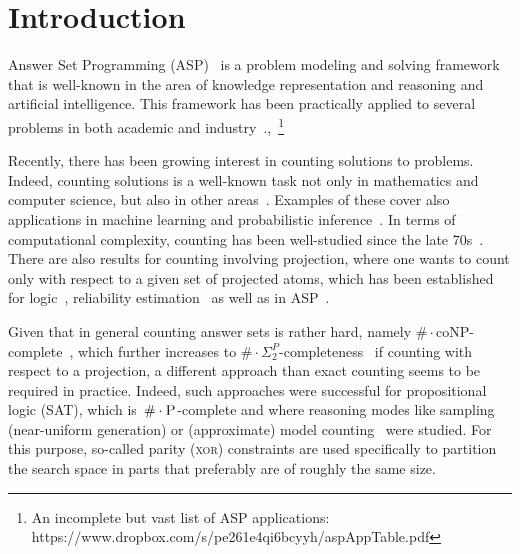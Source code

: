 \documentclass{article}
\renewcommand{\P}{\ensuremath{\textsc{P}}\xspace}
\newcommand{\cnt}[0]{\ensuremath{\#}}
\newcommand{\cntc}[0]{\ensuremath{\cnt\cdot}}
\newcommand{\XOR}{\textsc{xor}} %
\begin{document}
\section{Introduction} \label{sec:introduction}
%
Answer Set Programming (ASP)~\cite{Lifschitz99,BrewkaEiterTruszczynski11,GebserKaminskiKaufmannSchaub12} is a
problem modeling and solving framework that is well-known in the area
of knowledge representation and reasoning and artificial intelligence.
%
This framework has been practically applied to several
problems in both academic and industry~\cite{BalducciniGelfondNogueira06a,NiemelaSimonsSoininen99,NogueiraBalducciniGelfond01a,GuziolowskiEtAl13a,SchaubWoltran18}.,~\footnote{An incomplete but vast list of ASP applications:\\ https://www.dropbox.com/s/pe261e4qi6bcyyh/aspAppTable.pdf}
%

Recently, there has been growing interest in counting solutions to problems.
%
Indeed, counting solutions is a well-known task not only in mathematics and computer
science, but also in other
areas~\cite{ChakrabortyMeelVardi16a,DomshlakHoffmann07a,GomesKautzSabharwalSelman08a,SangBeameKautz05a}.
%
%
%
Examples of these cover also applications in machine learning and probabilistic inference~\cite{ChaviraDarwiche08a}.
%
%
In terms of computational complexity, counting has been well-studied since the
late
70s~\cite{DurandHermannKolaitis05,HemaspaandraVollmer95a,Valiant79,Valiant79b}.
%
There are also results for counting involving projection, where one wants to
count only with respect to a given set of projected atoms,
which has been established for logic~\cite{AzizChuMuise15a,CapelliMengel19,FichteEtAl18,LagniezMarquis19a,GuptaSharmaRoy19a,SharmaRoySoos19a},
reliability estimation~\cite{MeelEtAl17a} as well as in ASP~\cite{GebserKaufmannSchaub09a,Aziz15a,FichteHecher19}.
%

Given that in general counting answer sets is rather hard, namely ${\#\cdot\text{coNP}}$-complete~\cite{FichteEtAl17,DurandHermannKolaitis05}, which further increases
to ${\#\cdot\Sigma_2^P}$-completeness~\cite{FichteHecher19} if counting with respect to a projection,
a different approach than exact counting seems to be required in practice.
%
Indeed, such approaches were successful for propositional logic (SAT), which is~$\cntc\P$-complete and where reasoning modes like sampling (near-uniform generation)
or (approximate) model counting~\cite{gosase07a,chmeva13a,ChakrabortyMV13,SharmaRoySoos19a}
were studied.
%
For this purpose, so-called parity (\XOR{}) constraints are used specifically to partition the search space in parts that preferably are of roughly the same size.
\end{document}
